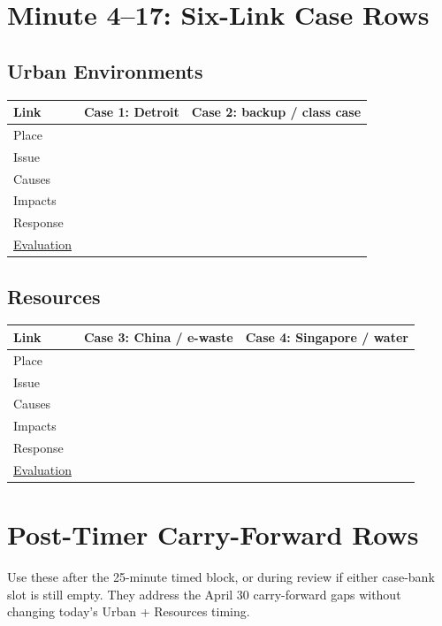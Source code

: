 \documentclass[11pt,a4paper]{article}
\begin{document}
\section{Minute 4--17: Six-Link Case Rows}

\subsection{Urban Environments}

\begin{tabularx}{\textwidth}{L{0.15\textwidth}Y Y}
\toprule
\textbf{Link} & \textbf{Case 1: Detroit} & \textbf{Case 2: backup / class case} \\
\midrule
Place & & \\
Issue & & \\
Causes & & \\
Impacts & & \\
Response & & \\
\uline{Evaluation} & & \\
\bottomrule
\end{tabularx}

\vspace{0.55em}

\subsection{Resources}

\begin{tabularx}{\textwidth}{L{0.15\textwidth}Y Y}
\toprule
\textbf{Link} & \textbf{Case 3: China / e-waste} & \textbf{Case 4: Singapore / water} \\
\midrule
Place & & \\
Issue & & \\
Causes & & \\
Impacts & & \\
Response & & \\
\uline{Evaluation} & & \\
\bottomrule
\end{tabularx}

\section{Post-Timer Carry-Forward Rows}

Use these after the 25-minute timed block, or during review if either case-bank
slot is still empty. They address the April 30 carry-forward gaps without
changing today's Urban + Resources timing.
\end{document}
